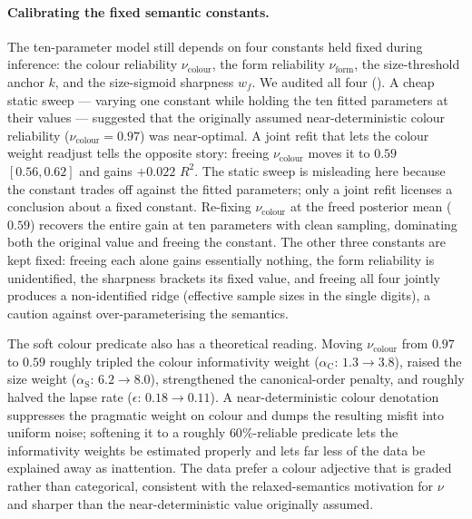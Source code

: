 \documentclass[man,floatsintext]{apa7}
\begin{document}
\paragraph{Calibrating the fixed semantic constants.}
The ten-parameter model still depends on four constants held fixed during inference: the colour reliability $\nu_\text{colour}$, the form reliability $\nu_\text{form}$, the size-threshold anchor $k$, and the size-sigmoid sharpness $w_f$.
We audited all four ().
A cheap static sweep --- varying one constant while holding the ten fitted parameters at their values --- suggested that the originally assumed near-deterministic colour reliability ($\nu_\text{colour}=0.97$) was near-optimal.
A joint refit that lets the colour weight readjust tells the opposite story: freeing $\nu_\text{colour}$ moves it to $0.59$ $[0.56, 0.62]$ and gains $+0.022$ $R^2$.
The static sweep is misleading here because the constant trades off against the fitted parameters; only a joint refit licenses a conclusion about a fixed constant.
Re-fixing $\nu_\text{colour}$ at the freed posterior mean ($0.59$) recovers the entire gain at ten parameters with clean sampling, dominating both the original value and freeing the constant.
The other three constants are kept fixed: freeing each alone gains essentially nothing, the form reliability is unidentified, the sharpness brackets its fixed value, and freeing all four jointly produces a non-identified ridge (effective sample sizes in the single digits), a caution against over-parameterising the semantics.

The soft colour predicate also has a theoretical reading.
Moving $\nu_\text{colour}$ from $0.97$ to $0.59$ roughly tripled the colour informativity weight ($\alpha_\text{C}$: $1.3 \to 3.8$), raised the size weight ($\alpha_\text{S}$: $6.2 \to 8.0$), strengthened the canonical-order penalty, and roughly halved the lapse rate ($\epsilon$: $0.18 \to 0.11$).
A near-deterministic colour denotation suppresses the pragmatic weight on colour and dumps the resulting misfit into uniform noise; softening it to a roughly $60\%$-reliable predicate lets the informativity weights be estimated properly and lets far less of the data be explained away as inattention.
The data prefer a colour adjective that is graded rather than categorical, consistent with the relaxed-semantics motivation for $\nu$ and sharper than the near-deterministic value originally assumed.
\end{document}
